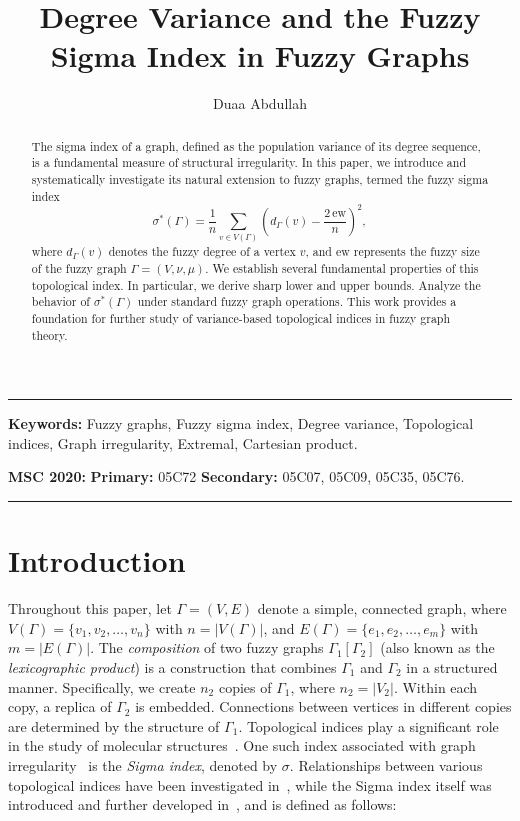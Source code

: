 \documentclass[12pt]{amsart}
\author{Duaa Abdullah}
\title{Degree Variance and the Fuzzy Sigma Index in Fuzzy Graphs}
\date{}
\begin{document}

\begin{abstract}
The sigma index of a graph, defined as the population variance of its degree sequence, is a fundamental measure of structural irregularity. In this paper, we introduce and systematically investigate its natural extension to fuzzy graphs, termed the fuzzy sigma index
$$
\sigma^*(\Gamma) = \frac{1}{n} \sum_{v \in V(\Gamma)} \left( d_\Gamma(v) - \frac{2\,\mathrm{ew}}{n}\right)^2,
$$
where $d_\Gamma(v)$ denotes the fuzzy degree of a vertex $v$, and $\mathrm{ew}$ represents the fuzzy size of the fuzzy graph $\Gamma=(V,\nu, \mu)$. We establish several fundamental properties of this topological index. In particular, we derive sharp lower and upper bounds.
Analyze the behavior of $\sigma^*(\Gamma)$ under standard fuzzy graph operations.  This work provides a foundation for further study of variance-based topological indices in fuzzy graph theory.
\end{abstract}

\maketitle


\noindent\rule{17.5cm}{1.0pt}

\noindent
\textbf{Keywords:} Fuzzy graphs, Fuzzy sigma index, Degree variance, Topological indices, Graph irregularity, Extremal, Cartesian product.


\medskip

\noindent
{\bf MSC 2020:}  \textbf{Primary:} 05C72
\textbf{Secondary:} 05C07, 05C09, 05C35, 05C76.

\medskip

\noindent\rule{17.5cm}{1.0pt}

\section{Introduction}\label{sec1}
Throughout this paper, let $\Gamma=(V,E)$ denote a simple, connected graph, where $V(\Gamma)=\{v_1,v_2,\dots,v_n\}$ with $n=|V(\Gamma)|$, and $E(\Gamma)=\{e_1,e_2,\dots,e_m\}$ with $m=|E(\Gamma)|$.  The \textit{composition} of two fuzzy graphs $\Gamma_1[\Gamma_2]$ (also known as the \textit{lexicographic product}) is a construction that combines $\Gamma_1$ and $\Gamma_2$ in a structured manner. Specifically, we create $n_2$ copies of $\Gamma_1$, where $n_2 = |V_2|$. Within each copy, a replica of $\Gamma_2$ is embedded. Connections between vertices in different copies are determined by the structure of $\Gamma_1$.
Topological indices play a significant role in the study of molecular structures~\cite{Gao2016WangMR}. One such index associated with graph irregularity~\cite{Abdo2015Dimitrov} is the \emph{Sigma index}, denoted by $\sigma$. Relationships between various topological indices have been investigated in~\cite{Jahanbai2021Sheikholeslami}, while the Sigma index itself was introduced and further developed in~\cite{gutman2018inverse,Albalahi2023Alanazi,Jahanbanı2019Ediz,Ascioglu2018Cangul}, and is defined as follows:
\end{document}
